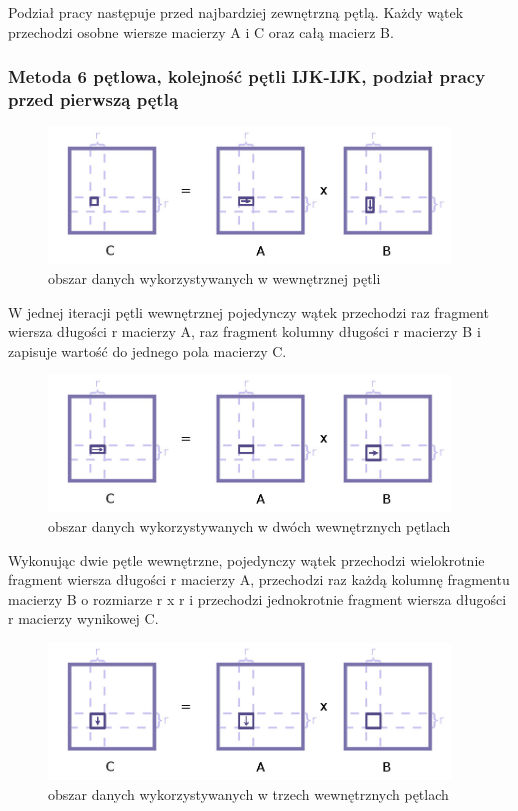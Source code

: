 \documentclass[12pt,a4paper]{article}
\begin{document}
Podział pracy następuje przed najbardziej zewnętrzną pętlą. Każdy wątek przechodzi osobne wiersze macierzy A i C oraz całą macierz B.

\subsubsection{Metoda 6 pętlowa, kolejność pętli IJK-IJK, podział pracy przed pierwszą pętlą}

\begin{figure}[H]
  \centering
    \includegraphics[width=0.95\textwidth]{IJKIJK_KK.jpg}
    \caption{obszar danych wykorzystywanych w wewnętrznej pętli}
\end{figure}

W jednej iteracji pętli wewnętrznej pojedynczy wątek przechodzi raz fragment wiersza długości r macierzy A, raz fragment kolumny długości r macierzy B i zapisuje wartość do jednego pola macierzy C.

\begin{figure}[H]
  \centering
    \includegraphics[width=0.95\textwidth]{IJKIJK_KKJJ.jpg}
    \caption{obszar danych wykorzystywanych w dwóch wewnętrznych pętlach}
\end{figure}

Wykonując dwie pętle wewnętrzne, pojedynczy wątek przechodzi wielokrotnie fragment wiersza długości r macierzy A, przechodzi raz każdą kolumnę fragmentu macierzy B o rozmiarze r x r i przechodzi jednokrotnie fragment wiersza długości r macierzy wynikowej C.

\begin{figure}[H]
  \centering
    \includegraphics[width=0.95\textwidth]{IJKIJK_KKJJII.jpg}
    \caption{obszar danych wykorzystywanych w trzech wewnętrznych pętlach}
\end{figure}
\end{document}
